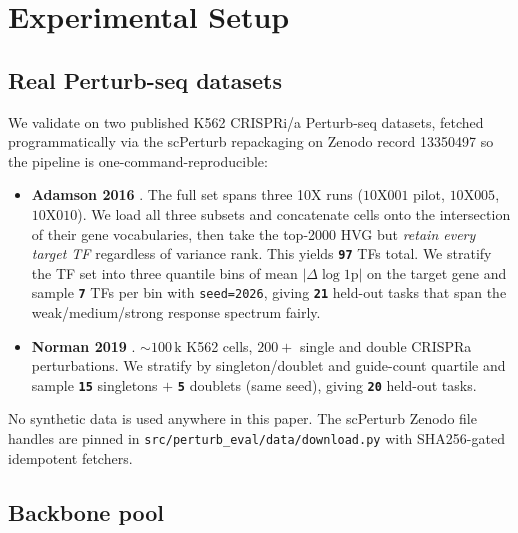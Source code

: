 
\section{Experimental Setup}\label{sec:setup_exp}

\subsection{Real Perturb-seq datasets}\label{subsec:datasets}

We validate on two published K562 CRISPRi/a Perturb-seq datasets,
fetched programmatically via the scPerturb repackaging
\citep{peidli2024scperturb} on Zenodo record 13350497 so the pipeline is
one-command-reproducible:

\begin{itemize}
  \item \textbf{Adamson 2016} \citep{adamson2016perturbseq}. The full
  set spans three 10X runs ($10\text{X}001$ pilot,
  $10\text{X}005$, $10\text{X}010$). We load all three subsets and
  concatenate cells onto the intersection of their gene vocabularies,
  then take the top-2000 HVG but \emph{retain every target TF}
  regardless of variance rank. This yields \texttt{\textbf{97}} TFs total.
  We stratify the TF set into three quantile bins of mean $|\Delta
  \log\text{1p}|$ on the target gene and sample \texttt{\textbf{7}} TFs
  per bin with \texttt{seed=2026}, giving
  \texttt{\textbf{21}} held-out tasks that span the weak/medium/strong
  response spectrum fairly.
  \item \textbf{Norman 2019} \citep{norman2019perturbseq}. ${\sim}100\,\text{k}$
  K562 cells, $200+$ single and double CRISPRa perturbations. We
  stratify by singleton/doublet and guide-count quartile and sample
  \texttt{\textbf{15}} singletons $+$ \texttt{\textbf{5}} doublets
  (same seed), giving \texttt{\textbf{20}} held-out tasks.
\end{itemize}

No synthetic data is used anywhere in this paper. The scPerturb
Zenodo file handles are pinned in
\texttt{src/perturb\_eval/data/download.py} with SHA256-gated
idempotent fetchers.

\subsection{Backbone pool}\label{subsec:backbones}


